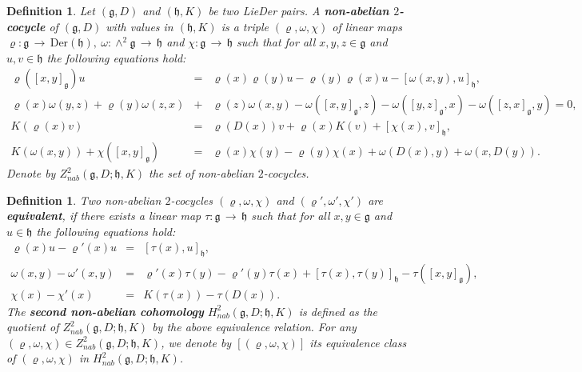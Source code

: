 \documentclass[12pt]{amsart}
\newtheorem{defi}[thm]{Definition}
\newcommand{\lon }{\,\rightarrow\,}
\newcommand{\g}{\mathfrak g}
\newcommand{\h}{\mathfrak h}
\newcommand{\Der}{\mathrm{Der}}
\begin{document}
\begin{defi}
Let $(\g, D)$ and $(\h, K)$ be two {\rm LieDer} pairs. A {\bf non-abelian $2$-cocycle} of $(\g, D)$ with values in $(\h, K)$ is a triple $(\varrho, \omega, \chi)$ of linear maps $\varrho: \g\lon\Der(\h),~\omega:\wedge^2\g\lon\h$ and $\chi:\g\lon\h$ such that for all $x, y, z\in\g$ and $u, v\in\h$ the following equations hold:
\begin{eqnarray}
\label{nc1}\varrho([x, y]_\g)u&=&\varrho(x)\varrho(y)u-\varrho(y)\varrho(x)u-[\omega(x, y), u]_\h,\\
\label{nc2}\varrho(x)\omega(y, z)+\varrho(y)\omega(z, x)&+&\varrho(z)\omega(x, y)-\omega([x, y]_\g, z)-\omega([y, z]_\g, x)-\omega([z, x]_\g, y)=0,\\
\label{nc3}K(\varrho(x)v)&=&\varrho(D(x))v+\varrho(x)K(v)+[\chi(x), v]_\h,\\
\label{nc4}K(\omega(x, y))+\chi([x, y]_\g)&=&\varrho(x)\chi(y)-\varrho(y)\chi(x)+\omega(D(x), y)+\omega(x, D(y)).
\end{eqnarray}
Denote by $Z^2_{nab}(\g, D;\h, K)$ the set of non-abelian $2$-cocycles.
\end{defi}

\begin{defi}
Two non-abelian $2$-cocycles $(\varrho, \omega, \chi)$ and $(\varrho', \omega', \chi')$ are {\bf equivalent}, if there exists a linear map $\tau:\g\lon\h$ such that for all $x, y\in\g$ and $u\in\h$ the following equations hold:
\begin{eqnarray}
\label{eq11}\varrho(x)u-\varrho'(x)u&=&[\tau(x), u]_\h,\\
\label{eq22}\omega(x, y)-\omega'(x, y)&=&\varrho'(x)\tau(y)-\varrho'(y)\tau(x)+[\tau(x), \tau(y)]_\h-\tau([x, y]_\g),\\
\label{eq33}\chi(x)-\chi'(x)&=&K(\tau(x))-\tau(D(x)).
\end{eqnarray}
The {\bf second non-abelian cohomology} $H^2_{nab}(\g, D;\h, K)$ is defined as the quotient of $Z^2_{nab}(\g, D;\h, K)$ by the above equivalence relation. For any $(\varrho, \omega, \chi)\in Z^2_{nab}(\g, D;\h, K)$, we denote by $[(\varrho, \omega, \chi)]$ its equivalence class of $(\varrho, \omega, \chi)$ in $H^2_{nab}(\g, D; \h, K)$.
\end{defi}
\end{document}
